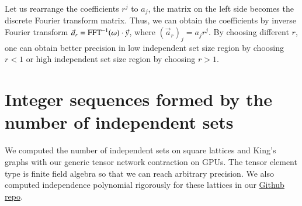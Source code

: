 \documentclass[onefignum, onetabnum]{siamart190516}
\newcommand{\<}{\langle}
\renewcommand{\>}{\rangle}
\begin{document}
Let us rearrange the coefficients $r^j$ to $a_j$, the matrix on the left side becomes the discrete Fourier transform matrix. Thus, we can obtain the coefficients by inverse Fourier transform $\vec a_r = {\rm FFT^{-1}}(\omega) \cdot \vec y$, where $(\vec a_r)_j = a_j r ^j$.
By choosing different $r$, one can obtain better precision in low independent set size region by choosing $r<1$ or high independent set size region by choosing $r>1$.

\section{Integer sequences formed by the number of independent sets}

We computed the number of independent sets on square lattices and King's graphs
with our generic tensor network contraction on GPUs.
The tensor element type is finite field algebra so that we can reach arbitrary precision.
We also computed independence polynomial rigorously for these lattices in our \href{https://github.com/GiggleLiu/NoteOnTropicalMIS/tree/master/data}{Github repo}.


\begin{table}[h]
\caption{The number of independent sets for square grid graphs of size $L\times L$. This forms the integer sequence \href{https://oeis.org/A006506}{OEIS A006506}.
Here we only show two updated entries for $L=38,39$, which to our knowledge, has not been computed before.~\cite{Butera2014}
}
\begin{center}
\end{center}
\label{tbl:squaregrid}
\end{table}
\end{document}

